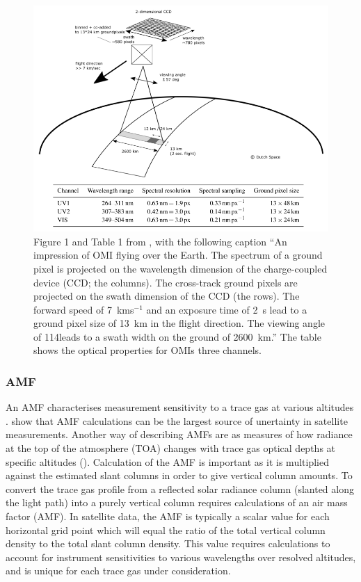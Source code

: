       \begin{figure}
        \includegraphics[width=\textwidth]{Figures/Shenkeveld_OMI_summary.png}
        \caption{ %
          Figure 1 and Table 1 from \textcite{Schenkeveld2017}, with the following caption ``An impression of OMI flying over the Earth.
          The spectrum of a ground pixel is projected on the wavelength dimension of the charge-coupled device (CCD; the columns). 
          The cross-track ground pixels are projected on the swath dimension of the CCD (the rows).
          The forward speed of 7~kms$^{-1}$ and an exposure time of 2~s lead to a ground pixel size of 13~km in the flight direction.
          The viewing angle of 114\degr leads to a swath width on the ground of 2600~km.''
          The table shows the optical properties for OMIs three channels.}
      \label{LR:HCHO:Sat:fig_Shenkeveld_OMI_summary}
      \end{figure}
        
    \subsubsection{AMF}
      
      An AMF characterises measurement sensitivity to a trace gas at various altitudes \cite[e.g.]{Palmer2001}.
      \textcite{Lorente2017} show that AMF calculations can be the largest source of unertainty in satellite measurements.
      Another way of describing AMFs are as measures of how radiance at the top of the atmosphere (TOA) changes with trace gas optical depths at specific altitudes (\textcite{Lorente2017}).
      Calculation of the AMF is important as it is multiplied against the estimated slant columns in order to give vertical column amounts.
      To convert the trace gas profile from a reflected solar radiance column (slanted along the light path) into a purely vertical column requires calculations of an air mass factor (AMF).
      In satellite data, the AMF is typically a scalar value for each horizontal grid point which will equal the ratio of the total vertical column density to the total slant column density.
      This value requires calculations to account for instrument sensitivities to various wavelengths over resolved altitudes, and is unique for each trace gas under consideration.
      
